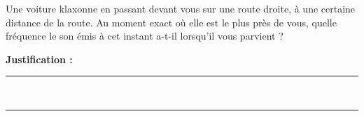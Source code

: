 Une voiture klaxonne en passant devant vous sur une route droite, à une certaine distance de la route. Au moment exact où elle est le plus près de vous, quelle fréquence le son émis à cet instant a-t-il lorsqu'il vous parvient ?

\choices

\noindent\textbf{Justification :} \hrulefill \\[2.5ex]
\rule{\linewidth}{0.4pt} \\[2.5ex]
\rule{\linewidth}{0.4pt}
\vfill
